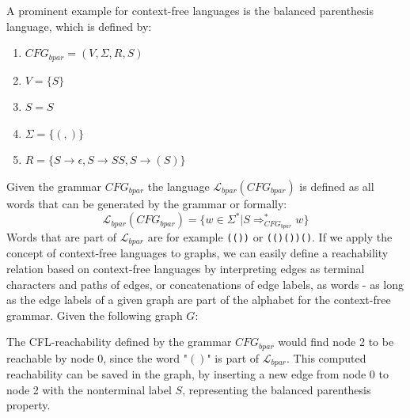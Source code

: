A prominent example for context-free languages is the balanced parenthesis language, which is defined by:
\begin{enumerate}
    \item $CFG_{bpar}=(V,\Sigma,R,S)$
    \item $V=\{S\}$
    \item $S=S$
    \item $\Sigma=\{(,)\}$
    \item $R=\{S\rightarrow\epsilon, S\rightarrow SS, S\rightarrow (S)\}$
\end{enumerate}
Given the grammar $CFG_{bpar}$ the language $\mathcal{L}_{bpar}(CFG_{bpar})$ is defined as all words that can be generated by the grammar or formally: $$\mathcal{L}_{bpar}(CFG_{bpar})= \{w\in \Sigma^* | S\Rightarrow_{CFG_{bpar}}^* w \}$$
Words that are part of $\mathcal{L}_{bpar}$ are for example \verb|(())| or \verb|(()())()|.
If we apply the concept of context-free languages to graphs, we can easily define a reachability relation based on context-free languages by interpreting edges as terminal characters and paths of edges, or concatenations of edge labels, as words - as long as the edge labels of a given graph are part of the alphabet for the context-free grammar.
Given the following graph $G$:
\begin{center}
\end{center}
The CFL-reachability defined by the grammar $CFG_{bpar}$ would find node 2 to be reachable by node 0, since the word "$()$" is part of $\mathcal{L}_{bpar}$.
This computed reachability can be saved in the graph, by inserting a new edge from node 0 to node 2 with the nonterminal label $S$, representing the balanced parenthesis property.
